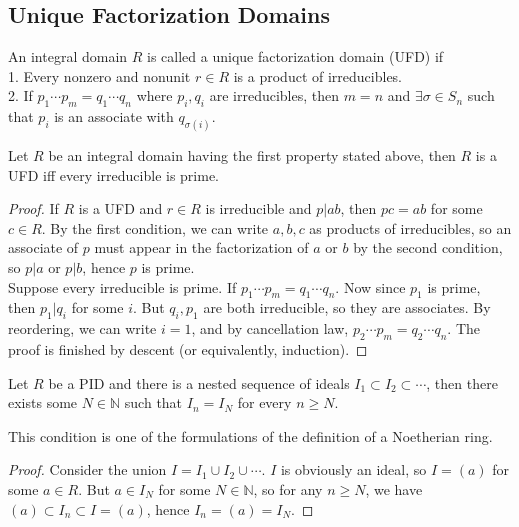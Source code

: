 \subsection{Unique Factorization Domains}
\begin{definition}
    An integral domain $R$ is called a unique factorization domain (UFD) if\\
    1. Every nonzero and nonunit $r\in R$ is a product of irreducibles.\\
    2. If $p_1\cdots p_m=q_1\cdots q_n$ where $p_i,q_i$ are irreducibles, then $m=n$ and $\exists\sigma\in S_n$ such that $p_i$ is an associate with $q_{\sigma(i)}$.
\end{definition}
\begin{proposition}\label{irred_prime_uniq}
    Let $R$ be an integral domain having the first property stated above, then $R$ is a UFD iff every irreducible is prime.
\end{proposition}
\begin{proof}
    If $R$ is a UFD and $r\in R$ is irreducible and $p|ab$, then $pc=ab$ for some $c\in R$.
    By the first condition, we can write $a,b,c$ as products of irreducibles, so an associate of $p$ must appear in the factorization of $a$ or $b$ by the second condition, so $p|a$ or $p|b$, hence $p$ is prime.\\
    Suppose every irreducible is prime.
    If $p_1\cdots p_m=q_1\cdots q_n$.
    Now since $p_1$ is prime, then $p_1|q_i$ for some $i$.
    But $q_i,p_1$ are both irreducible, so they are associates.
    By reordering, we can write $i=1$, and by cancellation law, $p_2\cdots p_m=q_2\cdots q_n$.
    The proof is finished by descent (or equivalently, induction).
\end{proof}
\begin{lemma}
    Let $R$ be a PID and there is a nested sequence of ideals $I_1\subset I_2\subset\cdots$, then there exists some $N\in\mathbb N$ such that $I_n=I_N$ for every $n\ge N$.
\end{lemma}
\begin{remark}
    This condition is one of the formulations of the definition of a Noetherian ring.
\end{remark}
\begin{proof}
    Consider the union $I=I_1\cup I_2\cup\cdots$.
    $I$ is obviously an ideal, so $I=(a)$ for some $a\in R$.
    But $a\in I_N$ for some $N\in\mathbb N$, so for any $n\ge N$, we have $(a)\subset I_n\subset I=(a)$, hence $I_n=(a)=I_N$.
\end{proof}
